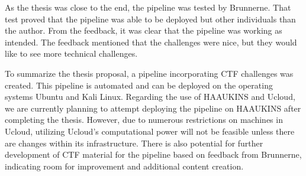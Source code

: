 As the thesis was close to the end, the pipeline was tested by Brunnerne. That test proved 
that the pipeline was able to be deployed but other individuals than the author. 
From the feedback, it was clear that the pipeline was working as intended. 
The feedback mentioned that the challenges were nice, but they would like to see more technical challenges.

To summarize the thesis proposal, a pipeline incorporating CTF challenges was created. 
This pipeline is automated and can be deployed on the operating systems Ubuntu and Kali Linux. 
Regarding the use of \ac{HAAUKINS} and \ac{Ucloud}, we are currently planning to attempt deploying the pipeline 
on HAAUKINS after completing the thesis. However, due to numerous restrictions on machines in \ac{Ucloud}, 
utilizing \ac{Ucloud}'s computational power will not be feasible unless there are changes within its infrastructure. 
There is also potential for further development of CTF material for the pipeline based on 
feedback from Brunnerne, indicating room for improvement and additional content creation.
